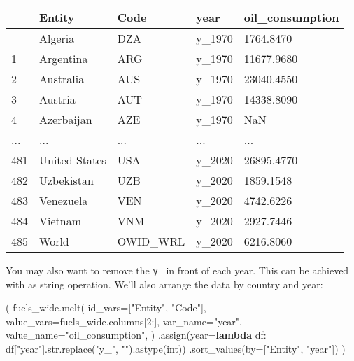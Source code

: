 \documentclass[
  letterpaper,
  DIV=11,
  numbers=noendperiod]{scrreprt}
\newenvironment{Shaded}{\begin{snugshade}}{\end{snugshade}}
\newcommand{\BuiltInTok}[1]{\textcolor[rgb]{0.00,0.23,0.31}{#1}}
\newcommand{\DecValTok}[1]{\textcolor[rgb]{0.68,0.00,0.00}{#1}}
\newcommand{\KeywordTok}[1]{\textcolor[rgb]{0.00,0.23,0.31}{\textbf{#1}}}
\newcommand{\NormalTok}[1]{\textcolor[rgb]{0.00,0.23,0.31}{#1}}
\newcommand{\OperatorTok}[1]{\textcolor[rgb]{0.37,0.37,0.37}{#1}}
\newcommand{\StringTok}[1]{\textcolor[rgb]{0.13,0.47,0.30}{#1}}
\begin{document}
\begin{longtable}[]{@{}lllll@{}}
\toprule\noalign{}
& Entity & Code & year & oil\_consumption \\
\midrule\noalign{}
\endhead
\bottomrule\noalign{}
\endlastfoot
0 & Algeria & DZA & y\_1970 & 1764.8470 \\
1 & Argentina & ARG & y\_1970 & 11677.9680 \\
2 & Australia & AUS & y\_1970 & 23040.4550 \\
3 & Austria & AUT & y\_1970 & 14338.8090 \\
4 & Azerbaijan & AZE & y\_1970 & NaN \\
... & ... & ... & ... & ... \\
481 & United States & USA & y\_2020 & 26895.4770 \\
482 & Uzbekistan & UZB & y\_2020 & 1859.1548 \\
483 & Venezuela & VEN & y\_2020 & 4742.6226 \\
484 & Vietnam & VNM & y\_2020 & 2927.7446 \\
485 & World & OWID\_WRL & y\_2020 & 6216.8060 \\
\end{longtable}

You may also want to remove the \texttt{y\_} in front of each year. This
can be achieved with as string operation. We'll also arrange the data by
country and year:

\begin{Shaded}
\begin{Highlighting}[]
\NormalTok{(}
\NormalTok{    fuels\_wide.melt(}
\NormalTok{        id\_vars}\OperatorTok{=}\NormalTok{[}\StringTok{"Entity"}\NormalTok{, }\StringTok{"Code"}\NormalTok{],}
\NormalTok{        value\_vars}\OperatorTok{=}\NormalTok{fuels\_wide.columns[}\DecValTok{2}\NormalTok{:],}
\NormalTok{        var\_name}\OperatorTok{=}\StringTok{"year"}\NormalTok{,}
\NormalTok{        value\_name}\OperatorTok{=}\StringTok{"oil\_consumption"}\NormalTok{,}
\NormalTok{    )}
\NormalTok{    .assign(year}\OperatorTok{=}\KeywordTok{lambda}\NormalTok{ df: df[}\StringTok{"year"}\NormalTok{].}\BuiltInTok{str}\NormalTok{.replace(}\StringTok{"y\_"}\NormalTok{, }\StringTok{""}\NormalTok{).astype(}\BuiltInTok{int}\NormalTok{))}
\NormalTok{    .sort\_values(by}\OperatorTok{=}\NormalTok{[}\StringTok{"Entity"}\NormalTok{, }\StringTok{"year"}\NormalTok{])}
\NormalTok{)}
\end{Highlighting}
\end{Shaded}
\end{document}
